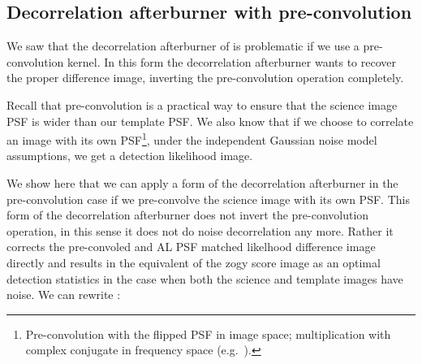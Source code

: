 \subsection{Decorrelation afterburner with pre-convolution\label{sec:decorr_preconv}}
%
\par We saw that the decorrelation afterburner of  is
problematic if we use a pre-convolution kernel. In this form the
decorrelation afterburner wants to recover the proper difference
image, inverting the pre-convolution operation completely.
%
\par Recall that pre-convolution is a practical way to ensure that the
science image PSF is wider than our template PSF. We also know that if
we choose to correlate an image with its own
PSF\footnote{Pre-convolution with the flipped PSF in image space;
  multiplication with complex conjugate in frequency space (e.g.\
  ).}, under the independent Gaussian noise model
assumptions, we get a detection likelihood image.
%
\par We show here that we can apply a form of the decorrelation
afterburner in the pre-convolution case if we pre-convolve the science
image with its own PSF. This form of the decorrelation afterburner
does not invert the pre-convolution operation, in this sense it does
not do noise decorrelation any more. Rather it corrects the
pre-convoled and AL PSF matched likelhood difference image directly
and results in the equivalent of the zogy score image as an optimal
detection statistics in the case when both the science and template
images have noise.
%
We can rewrite :
